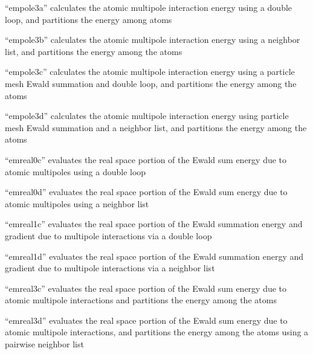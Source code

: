 \documentclass[letterpaper,11pt,english]{sphinxmanual}
\begin{document}

“empole3a” calculates the atomic multipole interaction energy
using a double loop, and partitions the energy among atoms


“empole3b” calculates the atomic multipole interaction energy
using a neighbor list, and partitions the energy among the atoms


“empole3c” calculates the atomic multipole interaction energy
using a particle mesh Ewald summation and double loop, and
partitions the energy among the atoms


“empole3d” calculates the atomic multipole interaction energy
using particle mesh Ewald summation and a neighbor list, and
partitions the energy among the atoms


“emreal0c” evaluates the real space portion of the Ewald sum
energy due to atomic multipoles using a double loop


“emreal0d” evaluates the real space portion of the Ewald sum
energy due to atomic multipoles using a neighbor list


“emreal1c” evaluates the real space portion of the Ewald
summation energy and gradient due to multipole interactions
via a double loop


“emreal1d” evaluates the real space portion of the Ewald
summation energy and gradient due to multipole interactions
via a neighbor list


“emreal3c” evaluates the real space portion of the Ewald sum
energy due to atomic multipole interactions and partitions
the energy among the atoms


“emreal3d” evaluates the real space portion of the Ewald sum
energy due to atomic multipole interactions, and partitions
the energy among the atoms using a pairwise neighbor list
\end{document}
